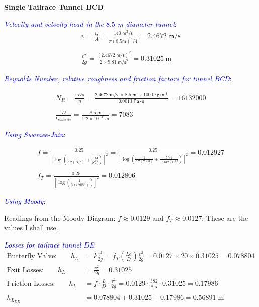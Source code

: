 \documentclass[10pt]{amsart}
\begin{document}
\textbf{Single Tailrace Tunnel BCD}

\textcolor{blue}{\em Velocity and velocity head in the $8.5$ m diameter tunnel}:\\

\begin{gather*}
	v = \frac{Q}{A} = \frac{140\mathsf{\;m^3/s}}{\pi(8.5\mathsf{ m})^2/4}=2.4672\mathsf{\ m/s}
	\\\\
	\frac{v^2}{2g} = \frac{(2.4672\mathsf{\;m/s})^2}{2\times9.81\mathsf{\;m/s^2}} = 0.31025\mathsf{\; m}
\end{gather*}

\textcolor{blue}{\em Reynolds Number, relative roughness and friction factors for tunnel BCD}:

\begin{gather*}
	N_R = \frac{vD\rho}{\eta} =
	\frac{2.4672\mathsf{\;m/s\;}\times8.5\mathsf{\;m\;}\times1000\mathsf{\;kg/m^3}}{0.0013\;\mathsf{Pa\cdot s}} =
	16132000
	\\\\
	\frac{D}{\epsilon_{concrete}} = \frac{8.5\;\text{m}}{1.2\times10^{-3}\text{ m}} = 7083
\end{gather*}

\textcolor{blue}{\em Using Swamee-Jain}:

\begin{gather*}
	f = \frac{0.25}{\left[\log\left(\frac{1}{3.7(D/\epsilon)}+\frac{5.74}{N_R^{0.9}}\right)\right]^2} =
	\frac{0.25}{\left[\log\left(\frac{1}{3.7(7083)}+\frac{5.74}{16132000^{0.9}}\right)\right]^2}=0.012927
	\\\\
	f_T = \frac{0.25}{\left[\log\left(\frac{1}{3.7(7083)}\right)\right]^2} = 0.012806
\end{gather*}

\textcolor{blue}{\em Using Moody}:

Readings from the Moody Diagram: $f\approx 0.0129$ and $f_T\approx 0.0127$. These are the
values I shall use.

\textcolor{blue}{\em Losses for tailrace tunnel DE}:
\begin{align*}
	\text{Butterfly Valve:}\qquad h_{L} & = k\frac{v^2}{2g} =                            
	f_T\left(\frac{Le}{D}\right)\frac{v^2}{2g}=0.0127\times 20\times 0.31025 = 0.078804\\
	\text{Exit Losses:}\qquad h_{L}     & =  \frac{v^2}{2g} = 0.31025                    \\
	\text{Friction Losses:}\qquad h_{L} & = f\cdot\frac{L}{D} \cdot\frac{v^2}{2g} =      
	0.0129\cdot\frac{382}{8.5}\cdot0.31025 = 0.17986
	\\\\
	h_{L_{DE}}                          & = 0.078804+0.31025+0.17986 = 0.56891\;\text{m} 
\end{align*}
\end{document}
